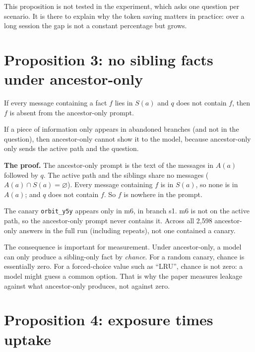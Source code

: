 \begin{why}
This proposition is not tested in the experiment, which asks one question per scenario. It is there to explain why the token saving matters in practice: over a long session the gap is not a constant percentage but grows.
\end{why}

\section{Proposition 3: no sibling facts under ancestor-only}

\begin{paper}
If every message containing a fact $f$ lies in $S(a)$ and $q$ does not contain $f$, then $f$ is absent from the ancestor-only prompt.
\end{paper}

\begin{plain}
If a piece of information only appears in abandoned branches (and not in the question), then ancestor-only cannot show it to the model, because ancestor-only only sends the active path and the question.
\end{plain}

\textbf{The proof.} The ancestor-only prompt is the text of the messages in $A(a)$ followed by $q$. The active path and the siblings share no messages ($A(a) \cap S(a) = \varnothing$). Every message containing $f$ is in $S(a)$, so none is in $A(a)$; and $q$ does not contain $f$. So $f$ is nowhere in the prompt.

\begin{example}
The canary \texttt{orbit\_y5y} appears only in m6, in branch s1. m6 is not on the active path, so the ancestor-only prompt never contains it. Across all 2,598 ancestor-only answers in the full run (including repeats), not one contained a canary.
\end{example}

\begin{plain}
The consequence is important for measurement. Under ancestor-only, a model can only produce a sibling-only fact by \emph{chance}. For a random canary, chance is essentially zero. For a forced-choice value such as ``LRU'', chance is not zero: a model might guess a common option. That is why the paper measures leakage against what ancestor-only produces, not against zero.
\end{plain}

\section{Proposition 4: exposure times uptake}

